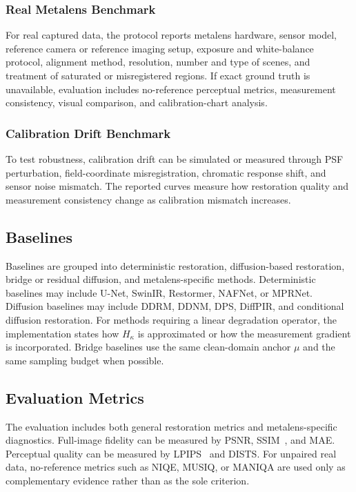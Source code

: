 \documentclass[journal]{IEEEtran}
\newcommand{\hk}{H_{\kappa}}
\begin{document}
\subsubsection{Real Metalens Benchmark}
For real captured data, the protocol reports metalens hardware, sensor model, reference camera or reference imaging setup, exposure and white-balance protocol, alignment method, resolution, number and type of scenes, and treatment of saturated or misregistered regions. If exact ground truth is unavailable, evaluation includes no-reference perceptual metrics, measurement consistency, visual comparison, and calibration-chart analysis.

\subsubsection{Calibration Drift Benchmark}
To test robustness, calibration drift can be simulated or measured through PSF perturbation, field-coordinate misregistration, chromatic response shift, and sensor noise mismatch. The reported curves measure how restoration quality and measurement consistency change as calibration mismatch increases.

\subsection{Baselines}
Baselines are grouped into deterministic restoration, diffusion-based restoration, bridge or residual diffusion, and metalens-specific methods. Deterministic baselines may include U-Net, SwinIR, Restormer, NAFNet, or MPRNet. Diffusion baselines may include DDRM, DDNM, DPS, DiffPIR, and conditional diffusion restoration. For methods requiring a linear degradation operator, the implementation states how $\hk$ is approximated or how the measurement gradient is incorporated. Bridge baselines use the same clean-domain anchor $\mu$ and the same sampling budget when possible.

\subsection{Evaluation Metrics}
The evaluation includes both general restoration metrics and metalens-specific diagnostics. Full-image fidelity can be measured by PSNR, SSIM~\cite{wang2004ssim}, and MAE. Perceptual quality can be measured by LPIPS~\cite{zhang2018lpips} and DISTS. For unpaired real data, no-reference metrics such as NIQE, MUSIQ, or MANIQA are used only as complementary evidence rather than as the sole criterion.
\end{document}
